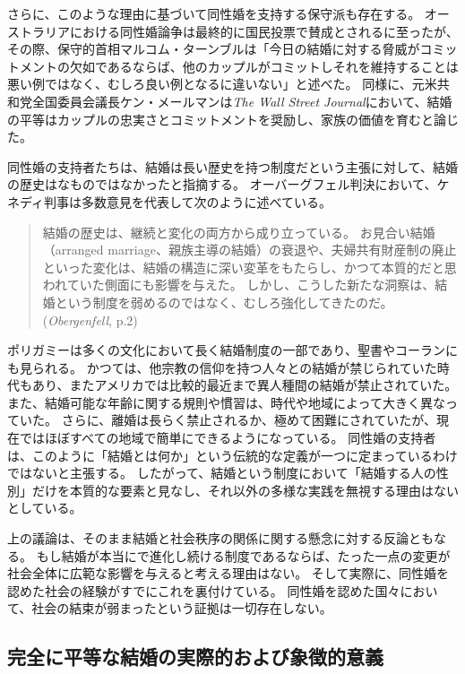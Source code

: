 \documentclass[paper=a4,book,openany]{jlreq}
\begin{document}
さらに、このような理由に基づいて同性婚を支持する保守派も存在する。
オーストラリアにおける同性婚論争は最終的に国民投票で賛成とされるに至ったが、その際、保守的首相マルコム・ターンブルは「今日の結婚に対する脅威がコミットメントの欠如であるならば、他のカップルがコミットしそれを維持することは悪い例ではなく、むしろ良い例となるに違いない」と述べた\citep{gartrell17:_malcol_turnb_makes_conser_case}。
同様に、元米共和党全国委員会議長ケン・メールマンは\emph{The Wall Street Journal}において、結婚の平等はカップルの忠実さとコミットメントを奨励し、家族の価値を育むと論じた\citep{mehlman12:_makin_same_sex_case}。

同性婚の支持者たちは、結婚は長い歴史を持つ制度だという主張に対して、結婚の歴史はなものではなかったと指摘する。
オーバーグフェル判決において、ケネディ判事は多数意見を代表して次のように述べている。

\begin{quote}
結婚の歴史は、継続と変化の両方から成り立っている。
お見合い結婚（arranged marriage、親族主導の結婚）の衰退や、夫婦共有財産制の廃止といった変化は、結婚の構造に深い変革をもたらし、かつて本質的だと思われていた側面にも影響を与えた。
しかし、こうした新たな洞察は、結婚という制度を弱めるのではなく、むしろ強化してきたのだ。
(\emph{Obergenfell}, p.2)
\end{quote}

ポリガミーは多くの文化において長く結婚制度の一部であり、聖書やコーランにも見られる。
かつては、他宗教の信仰を持つ人々との結婚が禁じられていた時代もあり、またアメリカでは比較的最近まで異人種間の結婚が禁止されていた。
また、結婚可能な年齢に関する規則や慣習は、時代や地域によって大きく異なっていた。
さらに、離婚は長らく禁止されるか、極めて困難にされていたが、現在ではほぼすべての地域で簡単にできるようになっている。
同性婚の支持者は、このように「結婚とは何か」という伝統的な定義が一つに定まっているわけではないと主張する。
したがって、結婚という制度において「結婚する人の性別」だけを本質的な要素と見なし、それ以外の多様な実践を無視する理由はないとしている。

上の議論は、そのまま結婚と社会秩序の関係に関する懸念に対する反論ともなる。
もし結婚が本当にで進化し続ける制度であるならば、たった一点の変更が社会全体に広範な影響を与えると考える理由はない。
そして実際に、同性婚を認めた社会の経験がすでにこれを裏付けている。
同性婚を認めた国々において、社会の結束が弱まったという証拠は一切存在しない。

\subsection{完全に平等な結婚の実際的および象徴的意義}
\end{document}
